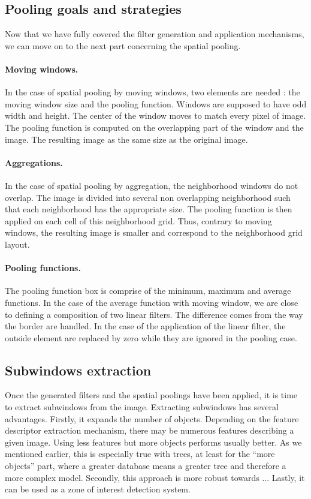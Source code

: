 \documentclass[a4paper]{report}
\begin{document}
		\subsection{Pooling goals and strategies}
		Now that we have fully covered the filter generation and application mechanisms, we can move on to the next part concerning the spatial pooling.
			\paragraph{Moving windows.}
			In the case of spatial pooling by moving windows, two elements are needed : the moving window size and the pooling function. Windows are supposed to have odd width and height. The center of the window moves to match every pixel of image. The pooling function is computed on the overlapping part of the window and the image. The resulting image as the same size as the original image.
			\paragraph{Aggregations.}
			In the case of spatial pooling by aggregation, the neighborhood windows do not overlap. The image is divided into several non overlapping neighborhood such that each neighborhood has the appropriate size. The pooling function is then applied on each cell of this neighborhood grid. Thus, contrary to moving windows, the resulting image is smaller and correspond to the neighborhood grid layout.
			\paragraph{Pooling functions.}
			The pooling function box is comprise of the minimum, maximum and average functions. In the case of the average function with moving window, we are close to defining a composition of two linear filters. The difference comes from the way the border are handled. In the case of the application of the linear filter, the outside element are replaced by zero while they are ignored in the pooling case.
			
		\subsection{Subwindows extraction}
		Once the generated filters and the spatial poolings have been applied, it is time to extract subwindows from the image. Extracting subwindows has several advantages. 
		Firstly, it expands the number of objects. Depending on the feature descriptor extraction mechanism, there may be numerous features describing a given image. Using less features but more objects performs usually better. As we mentioned earlier, this is especially true with trees, at least for the ``more objects'' part, where a greater database means a greater tree and therefore a more complex model.
		Secondly, this approach is more robust towards ...%
		Lastly, it can be used as a zone of interest detection system. %
		
\end{document}
